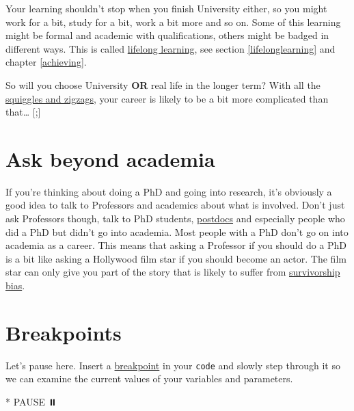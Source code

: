\documentclass[
]{book}
\newenvironment{Shaded}{\begin{snugshade}}{\end{snugshade}}
\newcommand{\NormalTok}[1]{#1}
\newcommand{\SpecialStringTok}[1]{\textcolor[rgb]{0.31,0.60,0.02}{#1}}
\begin{document}
Your learning shouldn't stop when you finish University either, so you might work for a bit, study for a bit, work a bit more and so on. Some of this learning might be formal and academic with qualifications, others might be badged in different ways. This is called \href{https://en.wikipedia.org/wiki/Lifelong_learning}{lifelong learning}, see section \ref{lifelonglearning} and chapter \ref{achieving}.

So will you choose University \textbf{OR} real life in the longer term? With all the \href{https://www.amazingif.com/listen/}{squiggles and zigzags}, your career is likely to be a bit more complicated than that\ldots{} {[}\citet{squigglybook};{]}

\hypertarget{prof}{%
\section{Ask beyond academia}\label{prof}}

If you're thinking about doing a PhD and going into research, it's obviously a good idea to talk to Professors and academics about what is involved. Don't just ask Professors though, talk to PhD students, \href{https://en.wikipedia.org/wiki/Postdoctoral_researcher}{postdocs} and especially people who did a PhD but didn't go into academia. Most people with a PhD don't go on into academia as a career. \citep{postdochell} This means that asking a Professor if you should do a PhD is a bit like asking a Hollywood film star if you should become an actor. The film star can only give you part of the story that is likely to suffer from \href{https://en.wikipedia.org/wiki/Survivorship_bias}{survivorship bias}. \citep{therock}

\hypertarget{rbreakpoints}{%
\section{Breakpoints}\label{rbreakpoints}}

Let's pause here. Insert a \href{https://en.wikipedia.org/wiki/Breakpoint}{breakpoint} in your \texttt{code} and slowly step through it so we can examine the current values of your variables and parameters.

\begin{Shaded}
\begin{Highlighting}[]
\SpecialStringTok{* }\NormalTok{PAUSE ⏸️}
\end{Highlighting}
\end{Shaded}
\end{document}
